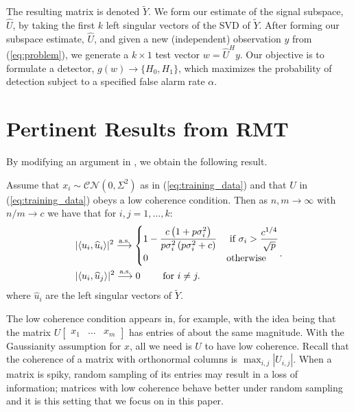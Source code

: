The resulting matrix is denoted $\widetilde{Y}$. We form our estimate of the signal subspace, $\widehat{U}$, by taking the first $k$ left singular vectors of the SVD of $\widetilde{Y}$. After forming our subspace estimate, $\widehat{U}$,  and given a new (independent) observation $y$ from (\ref{eq:problem}), we generate a $k \times 1$ test vector $w=\widehat{U}^Hy$. Our objective is to formulate a detector, $g(w)\to\{H_0,H_1\}$, which maximizes the probability of detection subject to a specified false alarm rate  $\alpha$.

\section{Pertinent Results from RMT}\label{sec:rmt}

By modifying an argument in  \cite{benaych2011singular}, we obtain the following result.
\begin{Th}\label{th:angles}
Assume that $x_i \sim \mathcal{CN}(0,\Sigma^2)$ as in (\ref{eq:training_data}) and that $U$ in (\ref{eq:training_data}) obeys a low coherence condition. Then as $n,m \longrightarrow \infty$ with $n/m \to c$ we have that for $i,j = 1, \ldots, k$:
\begin{equation*}
\begin{aligned}
&|\langle u_i,\widehat{u}_i\rangle|^2\overset{\textrm{a.s.}}{\longrightarrow}
\begin{cases}
1-\dfrac{c\left(1+p\sigma_i^2\right)}{p\sigma_i^2\left(p\sigma_i^2 + c\right)} & \text{ if } \sigma_{i}>\dfrac{c^{1/4}}{\sqrt{p}}\\
0 & \textrm{otherwise}\\
\end{cases}\\
&|\langle u_i,\widehat{u}_j\rangle|^2\overset{\textrm{a.s.}}{\longrightarrow} 0 \qquad \textrm{ for } i \neq j.\\
\end{aligned}.
\end{equation*}
where $\widehat{u}_i$ are the left singular vectors of $\widetilde{Y}$.
\end{Th}

The low coherence condition appears in, for example, \cite{balzano2010high} with the idea being that the matrix $U \begin{bmatrix} x_{1} & \ldots & x_{m} \end{bmatrix}$ has entries of about the same magnitude. With the Gaussianity assumption for $x$, all we need is $U$ to have low coherence. Recall that the coherence of a matrix with orthonormal columns is $\max_{i,j}|U_{i,j}|$. When a matrix is  spiky, random sampling of its entries may result in a loss of information; matrices with low coherence behave better under random sampling and it is this setting that we focus on in this paper.

